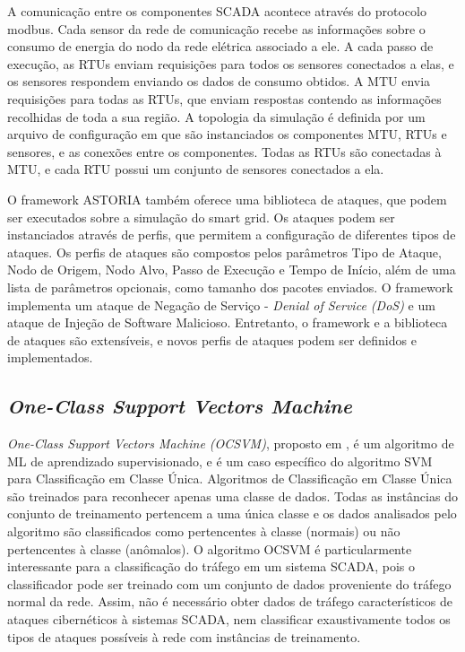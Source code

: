 \documentclass[12pt]{article}
\begin{document}
A comunicação entre os componentes SCADA acontece através do protocolo modbus. Cada sensor da rede de comunicação recebe as informações sobre o consumo de energia do nodo da rede elétrica associado a ele. A cada passo de execução, as RTUs enviam requisições para todos os sensores conectados a elas, e os sensores respondem enviando os dados de consumo obtidos. A MTU envia requisições para todas as RTUs, que enviam respostas contendo as informações recolhidas de toda a sua região. A topologia da simulação é definida por um arquivo de configuração em que são instanciados os componentes MTU, RTUs e sensores, e as conexões entre os componentes. Todas as RTUs são conectadas à MTU, e cada RTU possui um conjunto de sensores conectados a ela.

O framework ASTORIA também oferece uma biblioteca de ataques, que podem ser executados sobre a simulação do smart grid. Os ataques podem ser instanciados através de perfis, que permitem a configuração de diferentes tipos de ataques. Os perfis de ataques são compostos pelos parâmetros Tipo de Ataque, Nodo de Origem, Nodo Alvo, Passo de Execução e Tempo de Início, além de uma lista de parâmetros opcionais, como tamanho dos pacotes enviados. O framework implementa um ataque de Negação de Serviço - \emph{Denial of Service (DoS)} e um ataque de Injeção de Software Malicioso. Entretanto, o framework e a biblioteca de ataques são extensíveis, e novos perfis de ataques podem ser definidos e implementados.

\subsection{\emph{One-Class Support Vectors Machine}}
\label{subsecocsvm}

	\emph{One-Class Support Vectors Machine (OCSVM)}, proposto em \cite{scholkopf2001svm}, é um algoritmo de ML de aprendizado supervisionado, e é um caso específico do algoritmo SVM \cite{cortes1995support} para Classificação em Classe Única. Algoritmos de Classificação em Classe Única são treinados para reconhecer apenas uma classe de dados. Todas as instâncias do conjunto de treinamento pertencem a uma única classe e os dados analisados pelo algoritmo são classificados como pertencentes à classe (normais) ou não pertencentes à classe (anômalos). O algoritmo OCSVM é particularmente interessante para a classificação do tráfego em um sistema SCADA, pois o classificador pode ser treinado com um conjunto de dados proveniente do tráfego normal da rede. Assim, não é necessário obter dados de tráfego característicos de ataques cibernéticos à sistemas SCADA, nem classificar exaustivamente todos os tipos de ataques possíveis à rede com instâncias de treinamento.
\end{document}
